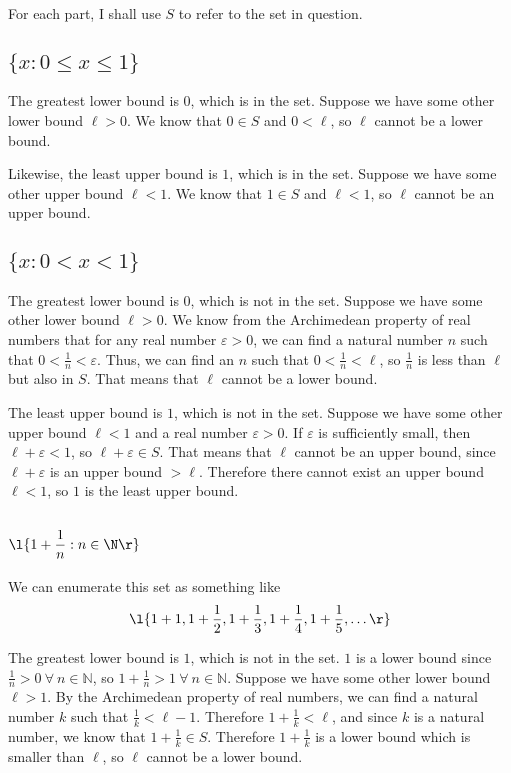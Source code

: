 \documentclass[a4paper]{article}
\begin{document}
For each part, I shall use $S$ to refer to the set in question.

\subsection{$\{x : 0 \le x \le 1\}$}

The greatest lower bound is $0$, which is in the set. Suppose we have some other lower bound $\ell > 0$. We know that $0 \in S$ and $0 < \ell$, so $\ell$ cannot be a lower bound.

Likewise, the least upper bound is $1$, which is in the set. Suppose we have some other upper bound $\ell < 1$. We know that $1 \in S$ and $\ell < 1$, so $\ell$ cannot be an upper bound.

\subsection{$\{x : 0 < x < 1\}$}

The greatest lower bound is $0$, which is not in the set. Suppose we have some other lower bound $\ell > 0$. We know from the Archimedean property of real numbers that for any real number $\varepsilon > 0$, we can find a natural number $n$ such that $0 < \frac{1}{n} < \varepsilon$. Thus, we can find an $n$ such that $0 < \frac{1}{n} < \ell$, so $\frac{1}{n}$ is less than $\ell$ but also in $S$. That means that $\ell$ cannot be a lower bound.

The least upper bound is $1$, which is not in the set. Suppose we have some other upper bound $\ell < 1$ and a real number $\varepsilon > 0$. If $\varepsilon$ is sufficiently small, then $\ell + \varepsilon < 1$, so $\ell + \varepsilon \in S$. That means that $\ell$ cannot be an upper bound, since $\ell + \varepsilon$ is an upper bound $> \ell$. Therefore there cannot exist an upper bound $\ell < 1$, so $1$ is the least upper bound.

\subsection{$\l\{ 1 + \dfrac{1}{n} : n \in \N \r\}$}

We can enumerate this set as something like \[ \l\{ 1 + 1, 1 + \frac12, 1 + \frac13, 1 + \frac14, 1 + \frac15, \ldots \r\} \]

The greatest lower bound is $1$, which is not in the set. $1$ is a lower bound since $\frac1n > 0\ \forall\ n \in \mathbb N$, so $1 + \frac1n > 1\ \forall\ n \in \mathbb N$. Suppose we have some other lower bound $\ell > 1$. By the Archimedean property of real numbers, we can find a natural number $k$ such that $\frac1k < \ell - 1$. Therefore $1 + \frac1k < \ell$, and since $k$ is a natural number, we know that $1 + \frac1k \in S$. Therefore $1 + \frac1k$ is a lower bound which is smaller than $\ell$, so $\ell$ cannot be a lower bound.
\end{document}

